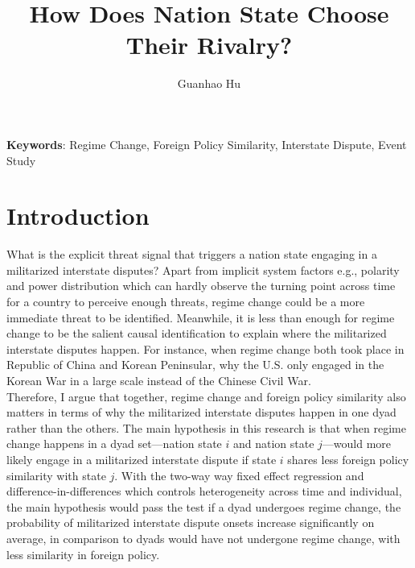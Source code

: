 \documentclass[12pt,a4paper]{article}
\title{How Does Nation State Choose Their Rivalry?}
\author[1]{Guanhao Hu}
\affil[1]{\small GPCO 486 Evaluating Technological Innovation}
\date{}  %
\begin{document}
\maketitle


\textbf{Keywords}: Regime Change, Foreign Policy Similarity, Interstate Dispute, Event Study

\section{Introduction}
What is the explicit threat signal that triggers a nation state engaging in a militarized interstate disputes? Apart from implicit system factors e.g., polarity and power distribution which can hardly observe the turning point across time for a country to perceive enough threats, regime change could be a more immediate threat to be identified. Meanwhile, it is less than enough for regime change to be the salient causal identification to explain where the militarized interstate disputes happen. For instance, when regime change both took place in Republic of China and Korean Peninsular, why the U.S. only engaged in the Korean War in a large scale instead of the Chinese Civil War. 
\\Therefore, I argue that together, regime change and foreign policy similarity also matters in terms of why the militarized interstate disputes happen in one dyad rather than the others. The main hypothesis in this research is that when regime change happens in a dyad set---nation state $i$ and nation state $j$---would more likely engage in a militarized interstate dispute if state $i$ shares less foreign policy similarity with state $j$. With the two-way way fixed effect regression and difference-in-differences which controls heterogeneity across time and individual, the main hypothesis would pass the test if a dyad undergoes regime change, the probability of militarized interstate dispute onsets increase significantly on average, in comparison to dyads would have not undergone regime change, with less similarity in foreign policy. 
\end{document}
